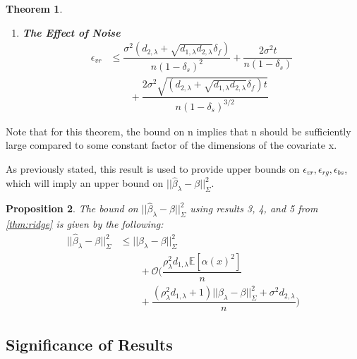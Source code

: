\documentclass[nohyperref]{article}
\theoremstyle{plain}
\newtheorem{theorem}{Theorem}[section]
\newtheorem{proposition}[theorem]{Proposition}
\theoremstyle{definition}
\theoremstyle{remark}
\begin{document}
\begin{theorem}
\begin{enumerate}
\begin{align*}
        &\qquad (1 + \sqrt{8t})^2 + \dfrac{16(b_{\lambda}\sqrt{d_{1, \lambda}} + \sqrt{\epsilon_{rg}})^2 t^2}{9n^2} \bigg) \\
        &\leq \dfrac{4}{(1 - \delta_s)^2} \bigg( \dfrac{\rho^2_{\lambda} d_{1, \lambda} \mathbb{E}[\alpha_{\lambda}(x)^2] + \epsilon_{rg}}{n} (1 + \sqrt{8t})^2 \\
        &\qquad + \dfrac{(b_{\lambda}\sqrt{d_{1, \lambda}} + \sqrt{\epsilon_{rg}})^2t^2}{} \bigg)
    \end{align*}
    \item \textbf{The Effect of Noise}
    \begin{align*}
        \epsilon_{vr} &\leq \dfrac{\sigma^2 (d_{2, \lambda} + \sqrt{d_{1, \lambda}d_{2, \lambda}} \delta_f)}{n (1 - \delta_s)^2} + \dfrac{2 \sigma^2 t}{n (1 - \delta_s)}\\
        &\qquad  + \dfrac{2\sigma^2 \sqrt{(d_{2, \lambda} + \sqrt{d_{1, \lambda}d_{2, \lambda}} \delta_f) t}}{n (1 - \delta_s)^{3/2}}
    \end{align*}
\end{enumerate}
\cite{HKZ2014}
\end{theorem}

Note that for this theorem, the bound on n implies that n should be sufficiently large compared to some constant factor of the dimensions of the covariate x. 

As previously stated, this result is used to provide upper bounds on $\epsilon_{vr}, \epsilon_{rg}, \epsilon_{bs}$, which will imply an upper bound on $||\hat{\beta}_{\lambda} - \beta||^2_{\Sigma}$.

\begin{proposition}
\label{prop:ridgeBound}
The bound on $||\hat{\beta}_{\lambda} - \beta||^2_{\Sigma}$ using results 3, 4, and 5 from \cref{thm:ridge} is given by the following:
\begin{align*}
    ||\hat{\beta}_{\lambda} - \beta||^2_{\Sigma} &\leq ||\beta_{\lambda} - \beta||^2_{\Sigma} \\
    &\qquad + \mathcal{O}\bigg(\dfrac{\rho^2_{\lambda} d_{1, \lambda} \mathbb{E}[\alpha(x)^2]}{n} \\
    &\qquad + \dfrac{ (\rho^2_{\lambda} d_{1, \lambda} +1 )||\beta_{\lambda} - \beta||^2_{\Sigma} + \sigma^2 d_{2, \lambda} }{n} \bigg)
\end{align*}
\cite{HKZ2014}
\end{proposition}

\subsection{Significance of Results}
\end{document}
